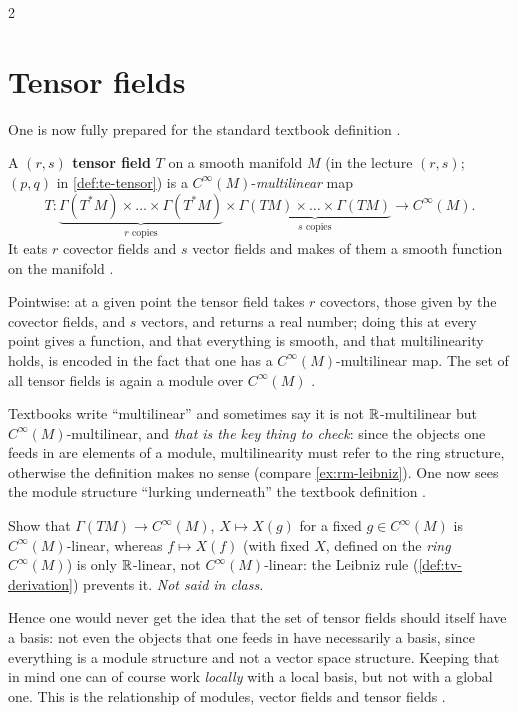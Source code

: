 \begin{paracol}{2}
\section{Tensor fields}\label{sec:rm-tensorfields}

One is now fully prepared for the standard textbook definition  .
\begin{definition}\label{def:rm-tensorfield}
A \textbf{$(r,s)$ tensor field} $T$ on a smooth manifold $M$ (in the lecture $(r,s)$; $(p,q)$ in \cref{def:te-tensor}) is a $C^\infty(M)$-\emph{multilinear} map
\[
  T\colon\underbrace{\Gamma(T^*M)\times\dots\times\Gamma(T^*M)}_{r\text{ copies}}\times\underbrace{\Gamma(TM)\times\dots\times\Gamma(TM)}_{s\text{ copies}}\longrightarrow C^\infty(M).
\]
It eats $r$ covector fields and $s$ vector fields and makes of them a smooth function on the manifold    .
\end{definition}
Pointwise: at a given point the tensor field takes $r$ covectors, those given by the covector fields, and $s$ vectors, and returns a real number; doing this at every point gives a function, and that everything is smooth, and that multilinearity holds, is encoded in the fact that one has a $C^\infty(M)$-multilinear map. The set of all tensor fields is again
a module over $C^\infty(M)$    .
\begin{remark}\label{rem:rm-multilinear}
Textbooks write ``multilinear'' and sometimes say it is not $\mathbb{R}$-multilinear but $C^\infty(M)$-multilinear, and \emph{that is the key thing to check}: since the objects one feeds in are elements of a module, multilinearity must refer to the ring structure, otherwise the definition makes no sense
(compare \cref{ex:rm-leibniz}). One now sees the module structure ``lurking underneath'' the textbook definition    .
\end{remark}
\begin{exercise}\label{ex:rm-leibniz}
Show that $\Gamma(TM)\to C^\infty(M)$, $X\mapsto X(g)$ for a fixed $g\in C^\infty(M)$ is $C^\infty(M)$-linear, whereas $f\mapsto X(f)$ (with fixed $X$, defined on the \emph{ring} $C^\infty(M)$) is only $\mathbb{R}$-linear, not $C^\infty(M)$-linear: the Leibniz rule (\cref{def:tv-derivation}) prevents it.
\emph{Not said in class.}
\end{exercise}
Hence one would never get the idea that the set of tensor fields should itself have a basis: not even the objects that one feeds in have necessarily a basis, since everything is a module structure and not a vector space structure. Keeping that in mind one can of course work \emph{locally} with a local basis, but not with a global one. This is the relationship of modules,
vector fields and tensor fields   .


\end{paracol}
